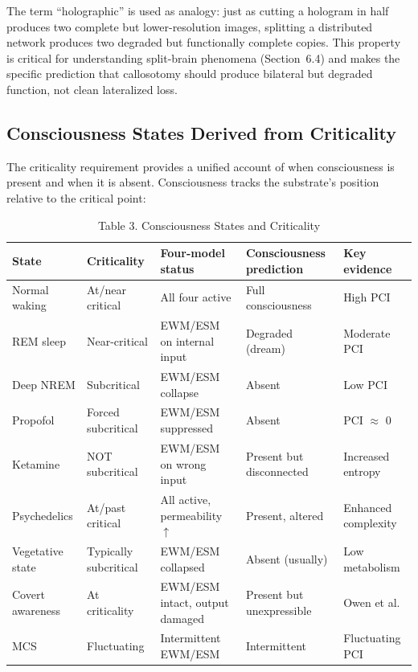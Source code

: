 \documentclass[12pt]{article}
\begin{document}
The term ``holographic'' is used as analogy: just as cutting a hologram in half produces two complete but lower-resolution images, splitting a distributed network produces two degraded but functionally complete copies. This property is critical for understanding split-brain phenomena (Section~6.4) and makes the specific prediction that callosotomy should produce bilateral but degraded function, not clean lateralized loss.


\subsection{Consciousness States Derived from Criticality}

The criticality requirement provides a unified account of when consciousness is present and when it is absent. Consciousness tracks the substrate's position relative to the critical point:

\begin{table}[htbp]
\centering
\caption{Table 3. Consciousness States and Criticality}
\label{tab:consciousness-states}
\small
\renewcommand{\arraystretch}{1.4}
\begin{tabular}{>{\raggedright}p{1.9cm} >{\raggedright}p{1.7cm} >{\raggedright}p{3.2cm} X >{\raggedright\arraybackslash}p{2cm}}
\toprule
\textbf{State} & \textbf{Criticality} & \textbf{Four-model status} & \textbf{Consciousness prediction} & \textbf{Key evidence} \\
\midrule
Normal waking & At/near critical & All four active & Full consciousness & High PCI \\
REM sleep & Near-critical & EWM/ESM on internal input & Degraded (dream) & Moderate PCI \\
Deep NREM & Subcritical & EWM/ESM collapse & Absent & Low PCI \\
Propofol & Forced subcritical & EWM/ESM suppressed & Absent & PCI $\approx$ 0 \\
Ketamine & NOT subcritical & EWM/ESM on wrong input & Present but disconnected & Increased entropy \\
Psychedelics & At/past critical & All active, permeability $\uparrow$ & Present, altered & Enhanced complexity \\
Vegetative state & Typically subcritical & EWM/ESM collapsed & Absent (usually) & Low metabolism \\
Covert awareness & At criticality & EWM/ESM intact, output damaged & Present but unexpressible & Owen et al.\ \\
MCS & Fluctuating & Intermittent EWM/ESM & Intermittent & Fluctuating PCI \\
\bottomrule
\end{tabular}
\end{table}
\end{document}
